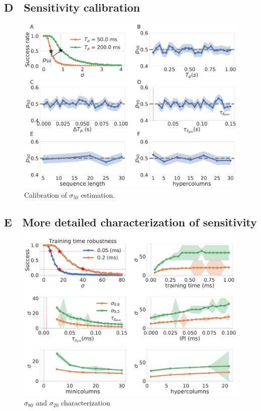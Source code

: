 \documentclass[10pt,a4paper]{article}
\begin{document}
\subsection*{D $\:$ Sensitivity calibration}

\begin{figure}[H]
\centering
\includegraphics[scale=0.20]{noise_estimates.pdf}
\caption{Calibration of $\sigma_{50}$ estimation.}
\label{fig:noise_calibration}
\end{figure}

\subsection*{E $\:$ More detailed characterization of sensitivity}

\begin{figure}[H]
\centering
\includegraphics[scale=0.20]{noise_robustness_appendix.pdf}
\caption{$\sigma_{80}$ and $\sigma_{20}$ characterization}
\label{fig:appendix_noise_sensitivity}
\end{figure}
\end{document}
